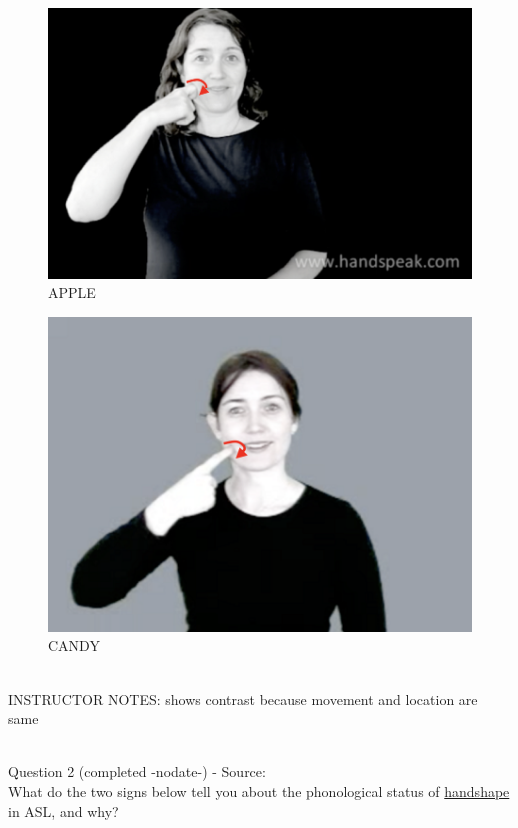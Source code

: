 \documentclass[12pt]{article}
\begin{document}
\begin{figure}[H]
\includegraphics{../images/asl_apple.png}
\caption{APPLE}
\end{figure}
\begin{figure}[H]
\includegraphics{../images/asl_candy.png}
\caption{CANDY}
\end{figure}

~\\
INSTRUCTOR NOTES: shows contrast because movement and location are same


~\\

{\large Question 2} (completed -nodate-) - Source: \\

What do the two signs below tell you about the phonological status of \underline{handshape} in ASL, and why?\\
\end{document}
